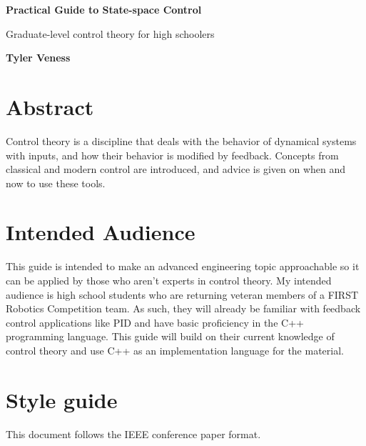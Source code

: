 \documentclass[10pt,conference,compsoc]{IEEEtran}
\begin{document}


\begin{titlepage}
  \begin{center}
    \vspace*{1cm}

    \Huge
    \textbf{Practical Guide to State-space Control}

    \vspace{0.5cm}
    \LARGE
    Graduate-level control theory for high schoolers

    \vspace{1.5cm}

    \textbf{Tyler Veness}

    \vfill

    \vspace{0.8cm}

  \end{center}

  \vfill

  \section{Abstract}

  \noindent Control theory is a discipline that deals with the behavior of
  dynamical systems with inputs, and how their behavior is modified by feedback.
  Concepts from classical and modern control are introduced, and advice is given
  on when and now to use these tools.

  \section{Intended Audience}

  \noindent This guide is intended to make an advanced engineering topic
  approachable so it can be applied by those who aren't experts in control
  theory. My intended audience is high school students who are returning veteran
  members of a FIRST Robotics Competition team. As such, they will already be
  familiar with feedback control applications like PID and have basic
  proficiency in the C++ programming language. This guide will build on their
  current knowledge of control theory and use C++ as an implementation language
  for the material.

  \section{Style guide}

  \noindent This document follows the IEEE conference paper format.

  \vspace{0.8cm}
\end{titlepage}
\thispagestyle{empty}  %
\end{document}
